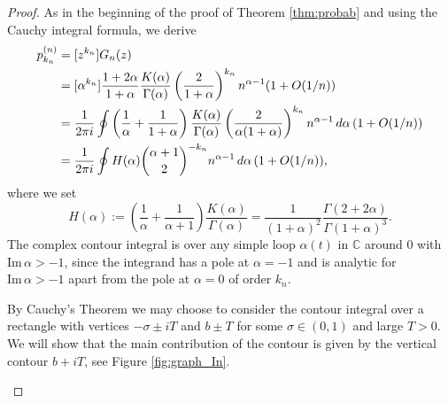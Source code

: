 \documentclass[10pt,a4paper]{amsart}
\newtheorem{scope}{Scope}
\def\CC{\mathbb{C}}
\newcommand{\dint}{\textup{d}}
\begin{document}
\begin{proof}
    As in the beginning of the proof of Theorem \ref{thm:probab} and using the Cauchy integral formula, we derive
    \begin{align*}
        p_{k_n}^{(n)} &= [z^{k_n}] G_n(z) \\
        &= [\alpha^{k_n}] \frac{1+2\alpha}{1+\alpha}\frac{K(\alpha)}{\Gamma(\alpha)} \left(\frac{2}{1+\alpha}\right)^{k_n} n^{\alpha-1} (1+O(1/n))\\
        &= \frac{1}{2\pi i} \oint \left(\frac{1}{\alpha}+\frac{1}{1+\alpha}\right)\frac{K(\alpha)}{\Gamma(\alpha)} \left(\frac{2}{\alpha(1+\alpha)}\right)^{k_n} 
             n^{\alpha-1} \,\dint \alpha\, (1+O(1/n))\\
        &= \frac{1}{2\pi i} \oint H(\alpha) \binom{\alpha+1}{2}^{-k_n}
            n^{\alpha-1} \, \dint\alpha\, (1+O(1/n)),
    \end{align*}
    where we set
    \begin{equation*}
        H(\alpha) := \left(\frac{1}{\alpha}+\frac{1}{\alpha+1}\right) \frac{K(\alpha)}{\Gamma(\alpha)} = \frac{1}{(1+\alpha)^2} \frac{\Gamma(2+2\alpha)}{\Gamma(1+\alpha)^3}.
    \end{equation*}
    The complex contour integral is over any simple loop $\alpha(t)$ in $\CC$ around $0$ with $\mathrm{Im}\, \alpha>-1$, since the integrand has a pole at $\alpha=-1$ and is analytic for $\mathrm{Im}\, \alpha>-1$ apart from the pole at $\alpha=0$ of order $k_n$.

By Cauchy's Theorem we may choose to consider the contour integral over a rectangle with vertices $-\sigma\pm i T$ and $b\pm T$ for some $\sigma\in (0,1)$ and large $T>0$.
We will show that the main contribution of the contour is given by the vertical contour $b+iT$, see Figure \ref{fig:graph_In}.

\begin{figure}[ht]
    \centering
\end{figure}
\end{proof}
\end{document}
